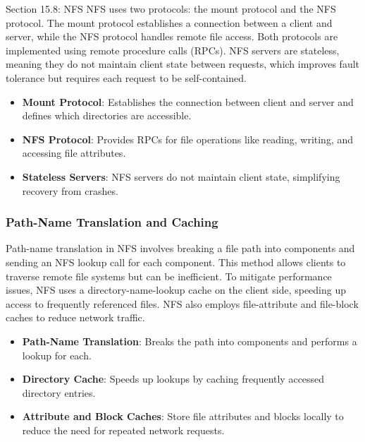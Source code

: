 \begin{notes}{Section 15.8: NFS}
    NFS uses two protocols: the mount protocol and the NFS protocol. The mount protocol establishes a connection between a client and server, while the NFS protocol handles remote file access. Both 
    protocols are implemented using remote procedure calls (RPCs). NFS servers are stateless, meaning they do not maintain client state between requests, which improves fault tolerance but requires 
    each request to be self-contained.
    
    \begin{highlight}
    
        \begin{itemize}
            \item \textbf{Mount Protocol}: Establishes the connection between client and server and defines which directories are accessible.
            \item \textbf{NFS Protocol}: Provides RPCs for file operations like reading, writing, and accessing file attributes.
            \item \textbf{Stateless Servers}: NFS servers do not maintain client state, simplifying recovery from crashes.
        \end{itemize}
    
    \end{highlight}
    
    \subsubsection*{Path-Name Translation and Caching}
    
    Path-name translation in NFS involves breaking a file path into components and sending an NFS lookup call for each component. This method allows clients to traverse remote file systems but can 
    be inefficient. To mitigate performance issues, NFS uses a directory-name-lookup cache on the client side, speeding up access to frequently referenced files. NFS also employs file-attribute and 
    file-block caches to reduce network traffic.
    
    \begin{highlight}
    
        \begin{itemize}
            \item \textbf{Path-Name Translation}: Breaks the path into components and performs a lookup for each.
            \item \textbf{Directory Cache}: Speeds up lookups by caching frequently accessed directory entries.
            \item \textbf{Attribute and Block Caches}: Store file attributes and blocks locally to reduce the need for repeated network requests.
        \end{itemize}
    

\end{highlight}
\end{notes}
